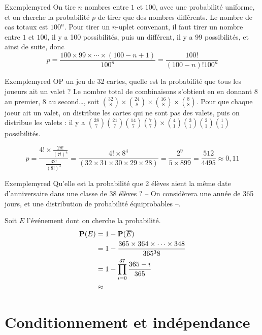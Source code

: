     \begin{omed}{Exemple}{myred}
        On tire $n$ nombres entre $1$ et $100$, avec une probabilité uniforme, et on cherche la probabilité $p$ de tirer que des nombres différents. Le nombre de cas totaux est $100^n$. Pour tirer un $n$-uplet convenant, il faut tirer un nombre entre $1$ et $100$, il y a 100 possibilités, puis un différent, il y a 99 possibilités, et ainsi de suite, donc 
        \[ p = \frac{100 \times 99 \times \cdots \times (100 - n + 1)}{100^n} = \frac{100!}{(100 - n)! 100^n} \] 
    \end{omed}

    \begin{omed}{Exemple}{myred}
        OP un jeu de 32 cartes, quelle est la probabilité que tous les joueurs ait un valet ? Le nombre total de combinaisons s’obtient en en donnant $8$ au premier, $8$ au second\ldots, soit $\binom{32}{8} \times \binom{24}{8} \times \binom{16}{8} \times \binom{8}{8}$. Pour que chaque joeur ait un valet, on distribue les cartes qui ne sont pas des valets, puis on distribue les valets : il y a $\binom{28}{7} \binom{21}{7} \binom{14}{7} \binom{7}{7} \times \binom{4}{1} \binom{3}{1} \binom{2}{1} \binom{1}{1}$ possibilités.

        \[ p = \frac{4!\times \frac{28!}{(7!)^4}}{\frac{32!}{(8!)^4}} = \frac{4 ! \times 8^4}{(32 \times 31 \times 30 \times 29 \times 28)} = \frac{2^9}{5 \times 899} = \frac{512}{4495} \approx 0,11 \]
    \end{omed}

    \begin{omed}{Exemple}{myred}
        Qu’elle est la probabilité que 2 élèves aient la même date d’anniversaire dans une classe de 38 élèves ? -- On considèrera une année de 365 jours, et une distribution de probabilité équiprobables --.

        Soit $E$ l’événement dont on cherche la probabilité. 
        \begin{align*}
            \mathbf{P}(E) &= 1 - \mathbf{P}(\overline{E}) \\
            &= 1 - \frac{365 \times 364 \times \cdots \times 348}{365^38} \\
            &= 1 - \prod_{i=0}^{37} \frac{365 - i}{365} \\
            &\approx 
        \end{align*}
    \end{omed}

\section{Conditionnement et indépendance}

